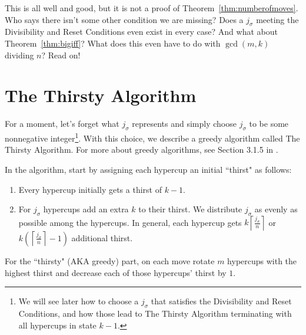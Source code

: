 \documentclass{article}
\theoremstyle{theorem}
\theoremstyle{definition}
\begin{document}
This is all well and good, but it is not a proof of Theorem~\ref{thm:numberofmoves}. Who says there isn't some other condition we are missing? Does a $j_\sigma$ meeting the Divisibility and Reset Conditions even exist in every case? And what about Theorem~\ref{thm:bigiff}? What does this even have to do with $\gcd(m,k)$ dividing $n$? Read on!

\section*{The Thirsty Algorithm}

For a moment, let's forget what $j_\sigma$ represents and simply choose $j_\sigma$ to be some nonnegative integer\footnote{We will see later how to choose a $j_\sigma$ that satisfies the Divisibility and Reset Conditions, and how those lead to The Thirsty Algorithm terminating with all hypercups in state $k-1$.}. With this choice, we describe a greedy algorithm called The Thirsty Algorithm. For more about greedy algorithms, see Section 3.1.5 in \cite{GreedyAlg}.

In the algorithm, start by assigning each hypercup an initial ``thirst" as follows:
 \begin{enumerate}
     \item Every hypercup initially gets a thirst of $k-1$.
     \item For $j_\sigma$ hypercups add an extra $k$ to their thirst. We distribute $j_\sigma$ as evenly as possible among the hypercups.   In general, each hypercup gets $k \left\lceil \frac{j_{\sigma}}{n} \right\rceil$ or $k (\left\lceil \frac{j_{\sigma}}{n} \right\rceil- 1)$ additional thirst.
 \end{enumerate} 
 For the ``thirsty" (AKA greedy) part, on each move rotate $m$ hypercups with the highest thirst and decrease each of those hypercups' thirst by $1$. 
\end{document}
